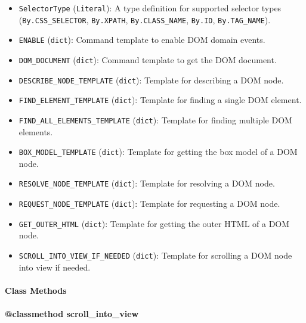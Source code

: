 \documentclass{article}
\begin{document}
\begin{itemize}
    \item \lstinline[style=pythonstyle]|SelectorType| (\lstinline[style=pythonstyle]|Literal|): A type definition for supported selector types (\lstinline[style=pythonstyle]|By.CSS_SELECTOR|, \lstinline[style=pythonstyle]|By.XPATH|, \lstinline[style=pythonstyle]|By.CLASS_NAME|, \lstinline[style=pythonstyle]|By.ID|, \lstinline[style=pythonstyle]|By.TAG_NAME|).
    \item \lstinline[style=pythonstyle]|ENABLE| (\lstinline[style=pythonstyle]|dict|): Command template to enable DOM domain events.
    \item \lstinline[style=pythonstyle]|DOM_DOCUMENT| (\lstinline[style=pythonstyle]|dict|): Command template to get the DOM document.
    \item \lstinline[style=pythonstyle]|DESCRIBE_NODE_TEMPLATE| (\lstinline[style=pythonstyle]|dict|): Template for describing a DOM node.
    \item \lstinline[style=pythonstyle]|FIND_ELEMENT_TEMPLATE| (\lstinline[style=pythonstyle]|dict|): Template for finding a single DOM element.
    \item \lstinline[style=pythonstyle]|FIND_ALL_ELEMENTS_TEMPLATE| (\lstinline[style=pythonstyle]|dict|): Template for finding multiple DOM elements.
    \item \lstinline[style=pythonstyle]|BOX_MODEL_TEMPLATE| (\lstinline[style=pythonstyle]|dict|): Template for getting the box model of a DOM node.
    \item \lstinline[style=pythonstyle]|RESOLVE_NODE_TEMPLATE| (\lstinline[style=pythonstyle]|dict|): Template for resolving a DOM node.
    \item \lstinline[style=pythonstyle]|REQUEST_NODE_TEMPLATE| (\lstinline[style=pythonstyle]|dict|): Template for requesting a DOM node.
    \item \lstinline[style=pythonstyle]|GET_OUTER_HTML| (\lstinline[style=pythonstyle]|dict|): Template for getting the outer HTML of a DOM node.
    \item \lstinline[style=pythonstyle]|SCROLL_INTO_VIEW_IF_NEEDED| (\lstinline[style=pythonstyle]|dict|): Template for scrolling a DOM node into view if needed.
\end{itemize}

\paragraph{Class Methods}
\paragraph{@classmethod scroll\_into\_view}
\end{document}
